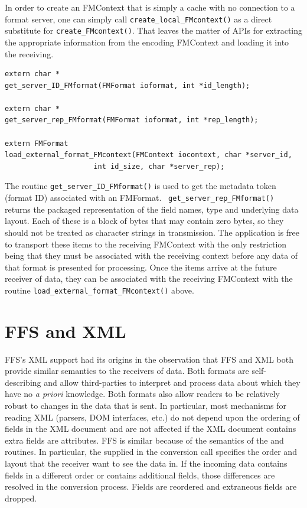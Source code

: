In order to create an FMContext that is simply a cache with no connection to
a format server, one can simply call {\tt create\_local\_FMcontext()} as a
direct substitute for {\tt create\_FMcontext()}.  That leaves the matter of
APIs for extracting the appropriate information from the encoding FMContext
and loading it into the receiving.  
\begin{verbatim}
extern char *
get_server_ID_FMformat(FMFormat ioformat, int *id_length);

extern char *
get_server_rep_FMformat(FMFormat ioformat, int *rep_length);

extern FMFormat
load_external_format_FMcontext(FMContext iocontext, char *server_id,
				     int id_size, char *server_rep);
\end{verbatim}
The routine {\tt get\_server\_ID\_FMformat()} is used to get the metadata
token (format ID) associated with an FMFormat.  {\tt
  get\_server\_rep\_FMformat()} returns the packaged representation of the
field names, type and underlying data layout.  Each of these is a block of
bytes that may contain zero bytes, so they should not be treated as
character strings in transmission.  The application is free to transport
these items to the receiving FMContext with the only restriction being that
they must be associated with the receiving context before any data of that
format is presented for processing.  Once the items arrive at the future
receiver of data, they can be associated with the receiving FMContext with
the routine {\tt load\_external\_format\_FMcontext()} above.


\section{FFS and XML\label{XML}}

FFS's XML support had its origins in the observation that FFS and XML both
provide similar semantics to the receivers of data.  Both formats are
self-describing and allow third-parties to interpret and process data about
which they have no {\it a priori} knowledge.  Both formats also allow
readers to be relatively robust to changes in the data that is sent.  In
particular, most mechanisms for reading XML (parsers, DOM interfaces, etc.)
do not depend upon the ordering of fields in the XML document and are not
affected if the XML document contains extra fields are attributes.  FFS is
similar because of the semantics of the  and
 routines.  In particular, the
 supplied in the conversion call specifies the order
and layout that the receiver want to see the data in.  If the incoming data
contains fields in a different order or contains additional fields, those
differences are resolved in the conversion process.  Fields are reordered
and extraneous fields are dropped.

